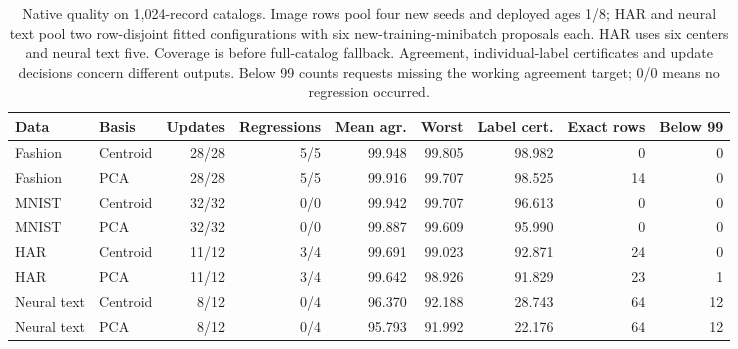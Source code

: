 \begin{table}[tbp]
\centering
\caption{Native quality on 1,024-record catalogs. Image rows pool four new seeds and deployed ages 1/8; HAR and neural text pool two row-disjoint fitted configurations with six new-training-minibatch proposals each. HAR uses six centers and neural text five. Coverage is before full-catalog fallback. Agreement, individual-label certificates and update decisions concern different outputs. Below 99 counts requests missing the working agreement target; 0/0 means no regression occurred.}
\label{tab:review-quality}
\begin{adjustbox}{max width=.98\textwidth,center=\textwidth}
\begin{tabular}{llrrrrrrr}
\toprule
Data & Basis & Updates & Regressions & Mean agr. & Worst & Label cert. & Exact rows & Below 99\\
\midrule
Fashion & Centroid & 28/28 & 5/5 & 99.948 & 99.805 & 98.982 & 0 & 0\\
Fashion & PCA & 28/28 & 5/5 & 99.916 & 99.707 & 98.525 & 14 & 0\\
MNIST & Centroid & 32/32 & 0/0 & 99.942 & 99.707 & 96.613 & 0 & 0\\
MNIST & PCA & 32/32 & 0/0 & 99.887 & 99.609 & 95.990 & 0 & 0\\
HAR & Centroid & 11/12 & 3/4 & 99.691 & 99.023 & 92.871 & 24 & 0\\
HAR & PCA & 11/12 & 3/4 & 99.642 & 98.926 & 91.829 & 23 & 1\\
Neural text & Centroid & 8/12 & 0/4 & 96.370 & 92.188 & 28.743 & 64 & 12\\
Neural text & PCA & 8/12 & 0/4 & 95.793 & 91.992 & 22.176 & 64 & 12\\
\bottomrule
\end{tabular}
\end{adjustbox}
\end{table}
